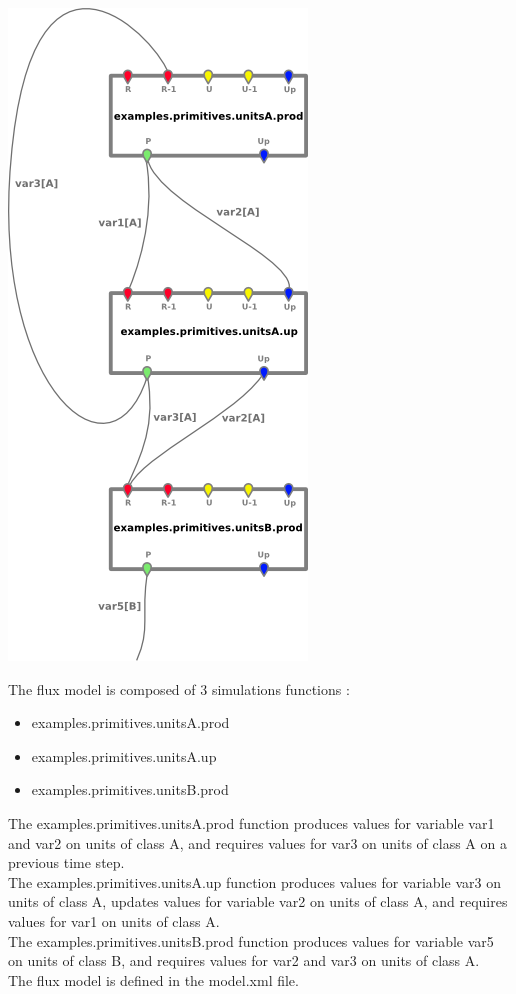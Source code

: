 \documentclass[a4paper,11pt]{article}
\begin{document}
\begin{floatingfigure}[right]{7cm}
\includegraphics[scale=0.8]{openfluid-engine_example-primitives_en/model.png}
\end{floatingfigure}
The flux model is composed of 3 simulations functions :\\
\begin{itemize}
\item examples.primitives.unitsA.prod
\item examples.primitives.unitsA.up
\item examples.primitives.unitsB.prod
\end{itemize}
The examples.primitives.unitsA.prod function produces values for 
variable var1 and var2 on units of class A, and requires values for var3 on units of class A 
on a previous time step.\\
The examples.primitives.unitsA.up function produces values for variable var3 on units of class A, 
updates values for variable var2 on units of class A, and requires values for var1 on units of class A.\\
The examples.primitives.unitsB.prod function produces values for variable var5 on units of class B,
and requires values for var2 and var3 on units of class A.\\
The flux model is defined in the model.xml file.
\end{document}
